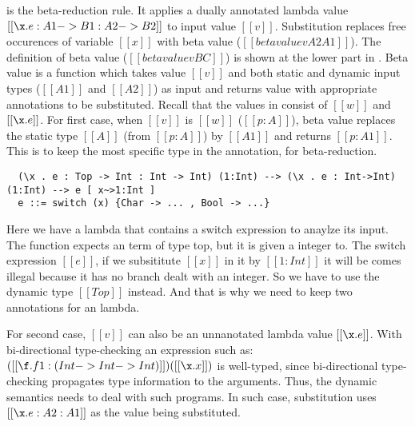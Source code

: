  is the beta-reduction rule. It applies a dually
annotated lambda value $[[\x.e : A1 -> B1 : A2 -> B2]]$ to input
value $[[v]]$. Substitution replaces free occurences of variable
$[[x]]$ with beta value ($[[betavalue v A2 A1]]$).
The definition of beta value ($[[betavalue v B C]]$) is shown at the lower part in
.
Beta value is a function which takes
value $[[v]]$ and both static and dynamic input types
($[[A1]]$ and $[[A2]]$) as input and returns value with
appropriate annotations to be substituted.
Recall that the values in \cal consist of $[[w]]$ and $[[\x.e]]$.
For first case, when $[[v]]$ is $[[w]]$ ($[[p:A]]$), beta value replaces the static type
$[[A]]$ (from $[[p:A]]$) by $[[A1]]$ and returns $[[p:A1]]$.
This is to keep the most specific type in the annotation, for beta-reduction.


\begin{verbatim}
  (\x . e : Top -> Int : Int -> Int) (1:Int) --> (\x . e : Int->Int) (1:Int) --> e [ x~>1:Int ]
  e ::= switch (x) {Char -> ... , Bool -> ...}
\end{verbatim}

Here we have a lambda that contains a switch expression to anaylze its input.
The function expects an term of type top, but it is given a integer to.
The switch expression $[[e]]$, if we subsititute $[[x]]$ in it by $[[1 : Int]]$
it will be comes illegal because it has no branch dealt with an integer.
So we have to use the dynamic type $[[Top]]$ instead. And that is why
we need to keep two annotations for an lambda.


For second case, $[[v]]$ can also be an unnanotated lambda value $[[\x.e]]$.
With bi-directional type-checking an expression such as:
$([[\f.f 1: (Int -> Int -> Int)]]) ([[\x.x]])$
is well-typed, since bi-directional type-checking propagates
type information to the arguments. Thus, the dynamic semantics
needs to deal with such programs.
In such case, substitution uses $[[\x.e:A2:A1]]$ as the value being substituted.





